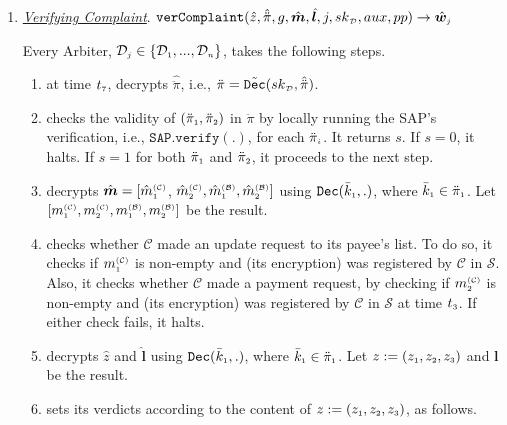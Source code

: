 \begin{enumerate}
\item\label{VerifyingComplaint}  \underline{\textit{Verifying Complaint}}. $\mathtt{verComplaint}(\hat z, \hat{\ddot{\pi}}, g, \hat {\bm m}, \hat{\bm{l}},  j, {sk}_{\scriptscriptstyle\mathcal {D}}, aux, pp)\rightarrow \hat{\bm w}_{\scriptscriptstyle j}$

Every Arbiter, $\mathcal{D}_{\scriptscriptstyle j}\in\{\mathcal{D}_{\scriptscriptstyle 1}, ..., \mathcal{D}_{\scriptscriptstyle n}\}$, takes the following steps.
\begin{enumerate}

%
\item at time $t_{\scriptscriptstyle 7}$, decrypts $\hat{\ddot{\pi}}$, i.e., ${\ddot{\pi}}={\tilde{\mathtt {Dec}}}({sk}_{\scriptscriptstyle\mathcal {D}}, \hat{\ddot \pi})$. 

\item checks the validity  of $(\ddot{\pi}_{\scriptscriptstyle 1}, \ddot{\pi}_{\scriptscriptstyle 2})$ in $\ddot{\pi}$ by locally running  the SAP's verification, i.e., $\mathtt{SAP.verify}(.)$, for each  $\ddot{\pi}_{\scriptscriptstyle i}$. It   returns  $s$. If $s=0$, it halts. If $s=1$ for both $\ddot{\pi}_{\scriptscriptstyle 1}$ and  $\ddot{\pi}_{\scriptscriptstyle 2}$, it proceeds to the next step. 
%
\item decrypts $\hat{\bm m}=[\hat{m}_{\scriptscriptstyle 1}^{\scriptscriptstyle(\mathcal C)}$, $\hat{m}_{\scriptscriptstyle 2}^{\scriptscriptstyle(\mathcal C)}, \hat{m}_{\scriptscriptstyle 1}^{\scriptscriptstyle(\mathcal B)}, \hat{m}_{\scriptscriptstyle 2}^{\scriptscriptstyle(\mathcal B)}]$  using $\mathtt{Dec}(\bar k_{\scriptscriptstyle 1},.)$, where $\bar k_{\scriptscriptstyle 1}\in\ddot \pi_{\scriptscriptstyle 1}$. Let $[{m}_{\scriptscriptstyle 1}^{\scriptscriptstyle(\mathcal C)},  {m}_{\scriptscriptstyle 2}^{\scriptscriptstyle(\mathcal C)},  {m}_{\scriptscriptstyle 1}^{\scriptscriptstyle(\mathcal B)}, {m}_{\scriptscriptstyle 2}^{\scriptscriptstyle(\mathcal B)}]$ be the result. 

\item  checks whether $\mathcal C$ made an update request to its payee's list. To do so, it checks if  $m_{\scriptscriptstyle 1}^{\scriptscriptstyle(\mathcal C)}$  is non-empty and (its encryption) was registered by $\mathcal{C}$ in $\mathcal{S}$. Also, it checks whether $\mathcal C$ made a payment request, by checking if $m_{\scriptscriptstyle 2}^{\scriptscriptstyle(\mathcal C)}$ is non-empty and (its encryption) was registered by $\mathcal{C}$ in $\mathcal{S}$ at time $t_{\scriptscriptstyle 3}$.  If either check fails, it halts. 
\item decrypts $\hat z$ and $\hat{\bm{l}}$ using $\mathtt{Dec}(\bar k_{\scriptscriptstyle 1},.)$, where $\bar k_{\scriptscriptstyle 1}\in\ddot \pi_{\scriptscriptstyle 1}$. Let $ z:=(z_{\scriptscriptstyle 1}, z_{\scriptscriptstyle 2}, z_{\scriptscriptstyle 3})$ and ${\bm{l}}$ be the result. 
%
\item\label{arbiters-verdict} sets its verdicts according to  the content of  $z:=(z_{\scriptscriptstyle 1}, z_{\scriptscriptstyle 2}, z_{\scriptscriptstyle 3})$, as follows.  
%
\begin{itemize}


\end{itemize}
\end{enumerate}
\end{enumerate}
